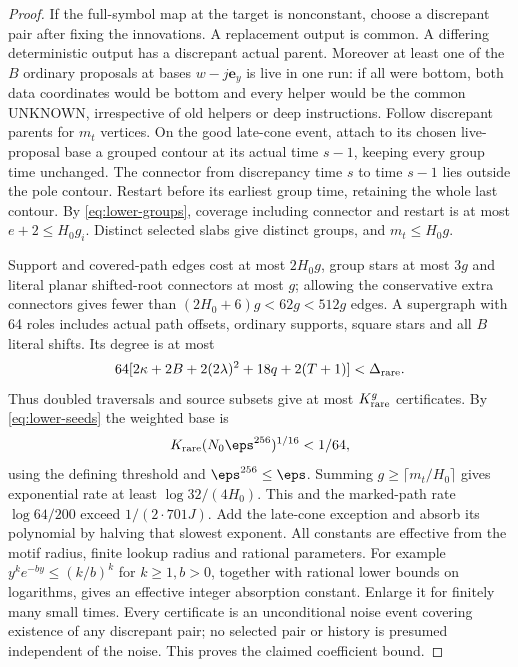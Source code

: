 \begin{proof}
If the full-symbol map at the target is nonconstant, choose a discrepant pair after fixing the innovations. A replacement output is common. A differing deterministic output has a discrepant actual parent. Moreover at least one of the $B$ ordinary proposals at bases $w-j\mathbf e_y$ is live in one run: if all were bottom, both data coordinates would be bottom and every helper would be the common UNKNOWN, irrespective of old helpers or deep instructions. Follow discrepant parents for $m_t$ vertices. On the good late-cone event, attach to its chosen live-proposal base a grouped contour at its actual time $s-1$, keeping every group time unchanged. The connector from discrepancy time $s$ to time $s-1$ lies outside the pole contour. Restart before its earliest group time, retaining the whole last contour. By \eqref{eq:lower-groups}, coverage including connector and restart is at most $e+2\le H_0g_i$. Distinct selected slabs give distinct groups, and $m_t\le H_0g$.

Support and covered-path edges cost at most $2H_0g$, group stars at most $3g$ and literal planar shifted-root connectors at most $g$; allowing the conservative extra connectors gives fewer than $(2H_0+6)g<62g<512g$ edges. A supergraph with 64 roles includes actual path offsets, ordinary supports, square stars and all $B$ literal shifts. Its degree is at most
\[
 64[2\kappa+2B+2(2\lambda)^2+18q+2(T+1)]<\Delta_{\rm rare}.
\]
Thus doubled traversals and source subsets give at most $K_{\rm rare}^g$ certificates. By \eqref{eq:lower-seeds} the weighted base is
\[
 K_{\rm rare}(N_0\eps^{256})^{1/16}<1/64,
\]
using the defining threshold and $\eps^{256}\le\eps$. Summing $g\ge\lceil m_t/H_0\rceil$ gives exponential rate at least $\log32/(4H_0)$. This and the marked-path rate $\log64/200$ exceed $1/(2\cdot701J)$. Add the late-cone exception and absorb its polynomial by halving that slowest exponent. All constants are effective from the motif radius, finite lookup radius and rational parameters. For example $y^ke^{-by}\le(k/b)^k$ for $k\ge1,b>0$, together with rational lower bounds on logarithms, gives an effective integer absorption constant. Enlarge it for finitely many small times. Every certificate is an unconditional noise event covering existence of any discrepant pair; no selected pair or history is presumed independent of the noise. This proves the claimed coefficient bound.
\end{proof}

